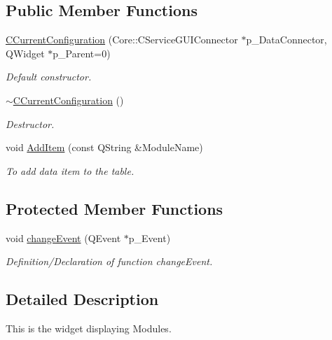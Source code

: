 \subsection*{\-Public \-Member \-Functions}
\begin{DoxyCompactItemize}
\item 
\hyperlink{classSystemTracking_1_1CCurrentConfiguration_a6bcd838b271a72cbeba77ff092950e8d}{\-C\-Current\-Configuration} (\-Core\-::\-C\-Service\-G\-U\-I\-Connector $\ast$p\-\_\-\-Data\-Connector, \-Q\-Widget $\ast$p\-\_\-\-Parent=0)
\begin{DoxyCompactList}\small\item\em \-Default constructor. \end{DoxyCompactList}\item 
\hyperlink{classSystemTracking_1_1CCurrentConfiguration_a22a63866326d475b4c7dfdebab63540b}{$\sim$\-C\-Current\-Configuration} ()
\begin{DoxyCompactList}\small\item\em \-Destructor. \end{DoxyCompactList}\item 
void \hyperlink{classSystemTracking_1_1CCurrentConfiguration_a81f0df8d0081e8295efd80698a41f3d6}{\-Add\-Item} (const \-Q\-String \&\-Module\-Name)
\begin{DoxyCompactList}\small\item\em \-To add data item to the table. \end{DoxyCompactList}\end{DoxyCompactItemize}
\subsection*{\-Protected \-Member \-Functions}
\begin{DoxyCompactItemize}
\item 
void \hyperlink{classSystemTracking_1_1CCurrentConfiguration_aeff07a2b2ebce890ddee84c992066a53}{change\-Event} (\-Q\-Event $\ast$p\-\_\-\-Event)
\begin{DoxyCompactList}\small\item\em \-Definition/\-Declaration of function change\-Event. \end{DoxyCompactList}\end{DoxyCompactItemize}


\subsection{\-Detailed \-Description}
\-This is the widget displaying \-Modules. 

